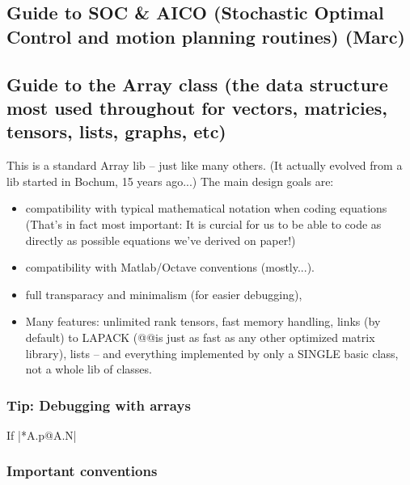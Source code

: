 \subsection{Guide to SOC \& AICO (Stochastic Optimal Control and motion
   planning routines) (Marc)}


\subsection{Guide to the Array class (the data structure most used throughout
   for vectors, matricies, tensors, lists, graphs, etc)}

This is a standard Array lib -- just like many others. (It actually
evolved from a lib started in Bochum, 15 years ago...) The main design
goals are:

\begin{itemize}
\item compatibility with typical mathematical notation when coding
equations (That's in fact most important: It is curcial for us to be
able to code as directly as possible equations we've derived on
paper!)

\item compatibility with Matlab/Octave conventions (mostly...).

\item full transparacy and minimalism (for easier debugging),

\item Many features: unlimited rank tensors, fast memory handling, links
(by default) to LAPACK (@@is just as fast as any other
optimized matrix library), lists -- and everything implemented by only
a SINGLE basic class, not a whole lib of classes.
\end{itemize}

\subsubsection{Tip: Debugging with arrays}

If |*A.p@A.N|


\subsubsection{Important conventions}

